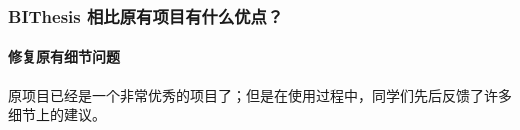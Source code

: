 \documentclass[
  aspectratio=169,
  presentation,
  titlegraphic=./images/bit.png,
  framelogo=./images/bit.png
]{bitbeamer}
\begin{document}
\begin{frame}[t]
  \frametitle{BIThesis 相比原有项目有什么优点？}
  \framesubtitle{修复原有细节问题}

  原项目已经是一个非常优秀的项目了；但是在使用过程中，同学们先后反馈了许多细节上的建议。
\end{frame}
\end{document}
